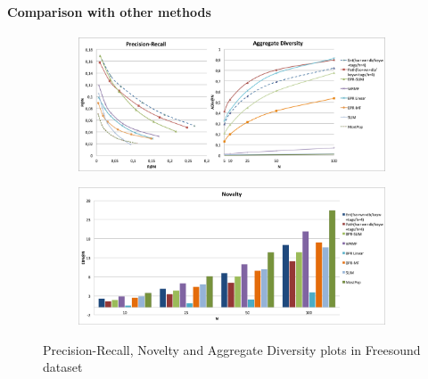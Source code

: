 \paragraph*{\textbf{Comparison with other methods}}\label{comp}
\begin{figure}
	\centering
	\begin{subfigure}[b]{\textwidth}
		\includegraphics[width=\textwidth]{ch07_graph-rec_pics/pr_adiv_fr.png}
	\end{subfigure}
	\begin{subfigure}[b]{\textwidth}
		\includegraphics[width=\textwidth]{ch07_graph-rec_pics/nov_fr.png}
	\end{subfigure}
	\caption{Precision-Recall, Novelty and Aggregate Diversity plots in Freesound dataset\label{fig:graph-rec:accur}}
\end{figure}
